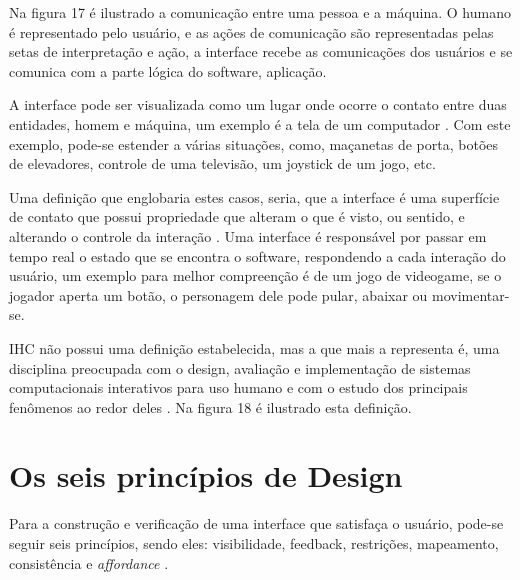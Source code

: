 \documentclass[12pt,oneside,a4paper,chapter=TITLE,section=TITLE,sumario=tradicional]{abntex2}
\begin{document}
Na figura 17 é ilustrado a comunicação entre uma pessoa e a máquina. O humano é representado pelo usuário, e as ações de comunicação são representadas pelas setas de interpretação e ação, a interface recebe as comunicações dos usuários e se comunica com a parte lógica do software, aplicação.

\begin{figure}[htb]
\end{figure}

A interface pode ser visualizada como um lugar onde ocorre o contato entre duas entidades, homem e máquina, um exemplo é a tela de um computador \cite{rocha2003}. Com este exemplo, pode-se estender a várias situações, como, maçanetas de porta, botões de elevadores, controle de uma televisão, um joystick de um jogo, etc.

Uma definição que englobaria estes casos, seria, que a interface é uma superfície de contato que possui propriedade que alteram o que é visto, ou sentido, e alterando o controle da interação \cite{laurel1993}. Uma interface é responsável por passar em tempo real o estado que se encontra o software, respondendo a cada interação do usuário, um exemplo para melhor compreenção é de um jogo de videogame, se o jogador aperta um botão, o personagem dele pode pular, abaixar ou movimentar-se.

IHC não possui uma definição estabelecida, mas a que mais a representa é, uma disciplina preocupada com o design, avaliação e implementação de sistemas computacionais interativos para uso humano e com o estudo dos principais fenômenos ao redor deles \cite{rocha2003}. Na figura 18 é ilustrado esta definição.

\begin{figure}[htb]
\end{figure}

\section{Os seis princípios de Design}
\label{sec:seisprincipios}

Para a construção e verificação de uma interface que satisfaça o usuário, pode-se seguir seis princípios, sendo eles: visibilidade, feedback, restrições, mapeamento, consistência e \textit{affordance} \cite{norman2002}.
\end{document}
